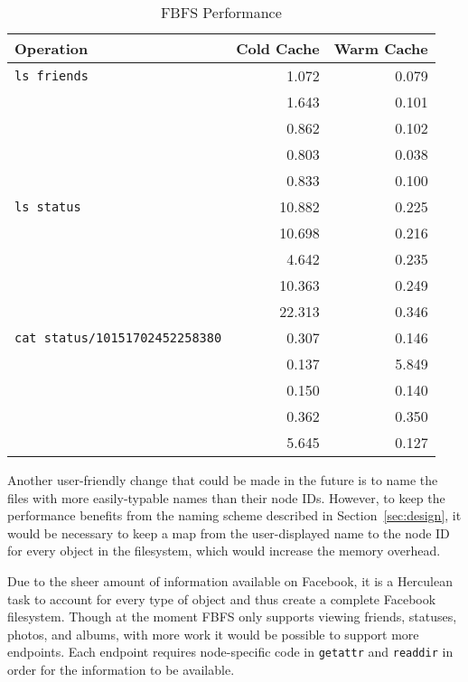 \documentclass[11pt,twocolumn]{article}
\begin{document}
\begin{table*}[h]
\centering
\caption{FBFS Performance}
\begin{tabular}{lrr} \toprule
Operation & Cold Cache & Warm Cache \\\midrule
\texttt{ls friends}                   &  1.072 & 0.079 \\
                                      &  1.643 & 0.101 \\
                                      &  0.862 & 0.102 \\
                                      &  0.803 & 0.038 \\
                                      &  0.833 & 0.100 \\\midrule
\texttt{ls status}                    & 10.882 & 0.225 \\
                                      & 10.698 & 0.216 \\
                                      &  4.642 & 0.235 \\
                                      & 10.363 & 0.249 \\
                                      & 22.313 & 0.346 \\\midrule
\texttt{cat status/10151702452258380} &  0.307 & 0.146 \\
                                      &  0.137 & 5.849 \\
                                      &  0.150 & 0.140 \\
                                      &  0.362 & 0.350 \\
                                      &  5.645 & 0.127 \\\bottomrule
\end{tabular}
\label{tab:perf}
\end{table*}

Another user-friendly change that could be made in the future is to name the
files with more easily-typable names than their node IDs. However, to keep the
performance benefits from the naming scheme described in
Section~\ref{sec:design}, it would be necessary to keep a map from the
user-displayed name to the node ID for every object in the filesystem, which
would increase the memory overhead.

Due to the sheer amount of information available on Facebook, it is a Herculean
task to account for every type of object and thus create a complete Facebook
filesystem. Though at the moment FBFS only supports viewing friends, statuses,
photos, and albums, with more work it would be possible to support more
endpoints. Each endpoint requires node-specific code in \texttt{getattr} and
\texttt{readdir} in order for the information to be available.
\end{document}
